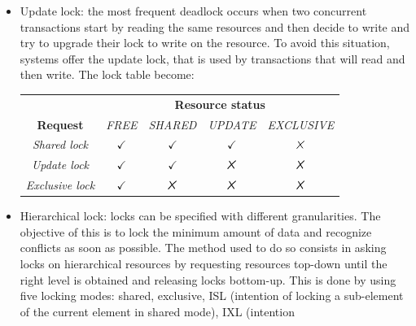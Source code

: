 \documentclass[12pt, a4paper]{report}
\newtheorem[style=M,bodystyle=\normalfont]{theorem}{Theorem}
\newtheorem[style=M,bodystyle=\normalfont]{corollary}{Corollary}
\newtheorem[style=M,bodystyle=\normalfont]{lemma}{Lemma}
\newtheorem[style=M,bodystyle=\normalfont]{definition}{Definition}
\newcommand{\tikzxmark}{%
\tikz[scale=0.23] {
    \draw[line width=0.7,line cap=round] (0,0) to [bend left=6] (1,1);
    \draw[line width=0.7,line cap=round] (0.2,0.95) to [bend right=3] (0.8,0.05);
}}
\begin{document}
    \begin{itemize}
        \item Update lock: the most frequent deadlock occurs when two concurrent transactions start by reading the same resources and then decide to write and try to upgrade their 
        lock to write on the resource. To avoid this situation, systems offer the update lock, that is used by transactions that will read and then write. The lock table become: 
        \begin{table}[H]
            \centering
            \begin{tabular}{ccccc}
            \textbf{}                                     & \multicolumn{4}{c}{\textbf{Resource status}}                                                                                                        \\ \cline{2-5} 
            \multicolumn{1}{c|}{\textbf{Request}}         & \textit{FREE}                     & \textit{SHARED}                   & \textit{UPDATE}                   & \multicolumn{1}{c|}{\textit{EXCLUSIVE}} \\ \hline
            \multicolumn{1}{|c|}{\textit{Shared lock}}    & \multicolumn{1}{c|}{$\checkmark$} & \multicolumn{1}{c|}{$\checkmark$} & \multicolumn{1}{c|}{$\checkmark$} & \multicolumn{1}{c|}{$\tikzxmark$}       \\ \hline
            \multicolumn{1}{|c|}{\textit{Update lock}}    & \multicolumn{1}{c|}{$\checkmark$} & \multicolumn{1}{c|}{$\checkmark$} & \multicolumn{1}{c|}{$\tikzxmark$} & \multicolumn{1}{c|}{$\tikzxmark$}       \\ \hline
            \multicolumn{1}{|c|}{\textit{Exclusive lock}} & \multicolumn{1}{c|}{$\checkmark$} & \multicolumn{1}{c|}{$\tikzxmark$} & \multicolumn{1}{c|}{$\tikzxmark$} & \multicolumn{1}{c|}{$\tikzxmark$}       \\ \hline
            \end{tabular}
        \end{table}
        \item Hierarchical lock: locks can be specified with different granularities. The objective of this is to lock the minimum amount of data and recognize conflicts as soon as
        possible. The method used to do so consists in asking locks on hierarchical resources by requesting resources top-down until the right level is obtained and releasing 
        locks bottom-up. This is done by using five locking modes: shared, exclusive, ISL (intention of locking a sub-element of the current element in shared mode), IXL (intention 

\end{itemize}
\end{document}
